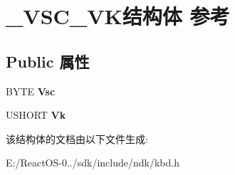\hypertarget{struct___v_s_c___v_k}{}\section{\+\_\+\+V\+S\+C\+\_\+\+V\+K结构体 参考}
\label{struct___v_s_c___v_k}
\subsection*{Public 属性}
\begin{DoxyCompactItemize}
\item 
\mbox{\label{struct___v_s_c___v_k_af033cb45d8dd0a55abbe7ff1e7267035}} 
B\+Y\+TE {\bfseries Vsc}
\item 
\mbox{\label{struct___v_s_c___v_k_a1b77358960f4312ee808bd0150f53279}} 
U\+S\+H\+O\+RT {\bfseries Vk}
\end{DoxyCompactItemize}


该结构体的文档由以下文件生成\+:\begin{DoxyCompactItemize}
\item 
E\+:/\+React\+O\+S-\/0../sdk/include/ndk/kbd.\+h\end{DoxyCompactItemize}
